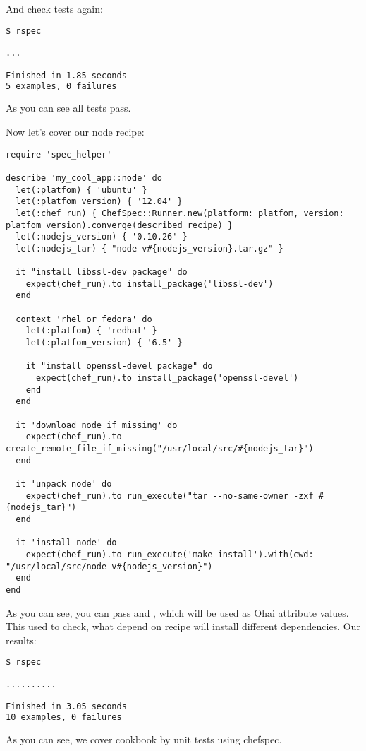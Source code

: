 And check tests again:

\begin{lstlisting}[language=Bash,label=lst:testing-chefspec7]
$ rspec

...

Finished in 1.85 seconds
5 examples, 0 failures
\end{lstlisting}

As you can see all tests pass.

Now let's cover our node recipe:

\begin{lstlisting}[label=lst:testing-chefspec8,title=my-server-cloud/site-cookbooks/my\_cool\_app/spec/unit/recipes/node\_spec.rb]
require 'spec_helper'

describe 'my_cool_app::node' do
  let(:platfom) { 'ubuntu' }
  let(:platfom_version) { '12.04' }
  let(:chef_run) { ChefSpec::Runner.new(platform: platfom, version: platfom_version).converge(described_recipe) }
  let(:nodejs_version) { '0.10.26' }
  let(:nodejs_tar) { "node-v#{nodejs_version}.tar.gz" }

  it "install libssl-dev package" do
    expect(chef_run).to install_package('libssl-dev')
  end

  context 'rhel or fedora' do
    let(:platfom) { 'redhat' }
    let(:platfom_version) { '6.5' }

    it "install openssl-devel package" do
      expect(chef_run).to install_package('openssl-devel')
    end
  end

  it 'download node if missing' do
    expect(chef_run).to create_remote_file_if_missing("/usr/local/src/#{nodejs_tar}")
  end

  it 'unpack node' do
    expect(chef_run).to run_execute("tar --no-same-owner -zxf #{nodejs_tar}")
  end

  it 'install node' do
    expect(chef_run).to run_execute('make install').with(cwd: "/usr/local/src/node-v#{nodejs_version}")
  end
end
\end{lstlisting}

As you can see, you can pass  and , which will be used as Ohai attribute values. This used to check, what depend on  recipe will install different dependencies. Our results:

\begin{lstlisting}[language=Bash,label=lst:testing-chefspec9]
$ rspec

..........

Finished in 3.05 seconds
10 examples, 0 failures
\end{lstlisting}

As you can see, we cover cookbook by unit tests using chefspec.